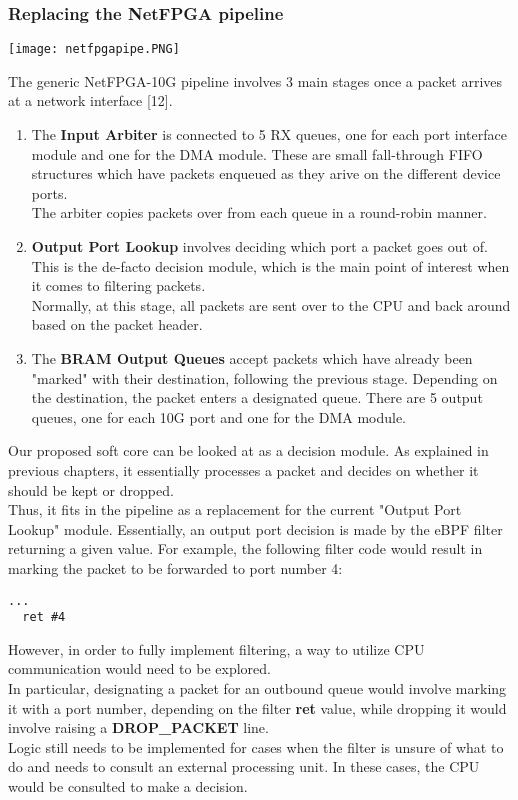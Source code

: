 \documentclass{l4proj}
\begin{document}
\subsubsection{Replacing the NetFPGA pipeline}
\begin{center}
\texttt{[image: netfpgapipe.PNG]}\\
\end{center}
The generic NetFPGA-10G pipeline involves 3 main stages once a packet arrives at a network interface [12].
\begin{enumerate}
    \item The \textbf{Input Arbiter} is connected to 5 RX queues, one for each port interface module and one for the DMA module. These are small fall-through FIFO structures which have packets enqueued as they arive on the different device ports.\\
    The arbiter copies packets over from each queue in a round-robin manner.
    \item \textbf{Output Port Lookup} involves deciding which port a packet goes out of. This is the de-facto decision module, which is the main point of interest when it comes to filtering packets.\\
    Normally, at this stage, all packets are sent over to the CPU and back around based on the packet header.
    \item The \textbf{BRAM Output Queues} accept packets which have already been "marked" with their destination, following the previous stage. Depending on the destination, the packet enters a designated queue. There are 5 output queues, one for each 10G port and one for the DMA module.
\end{enumerate}
Our proposed soft core can be looked at as a decision module. As explained in previous chapters, it essentially processes a packet and decides on whether it should be kept or dropped.\\
Thus, it fits in the pipeline as a replacement for the current "Output Port Lookup" module. Essentially, an output port decision is made by the eBPF filter returning a given value. For example, the following filter code would result in marking the packet to be forwarded to port number 4:
\begin{lstlisting}[language=ebpfAsm]
  ...
  ret #4
\end{lstlisting}
However, in order to fully implement filtering, a way to utilize CPU communication would need to be explored.\\
In particular, designating a packet for an outbound queue would involve marking it with a port number, depending on the filter \textbf{ret} value, while dropping it would involve raising a \textbf{DROP\_PACKET} line.\\
Logic still needs to be implemented for cases when the filter is unsure of what to do and needs to consult an external processing unit. In these cases, the CPU would be consulted to make a decision.
\end{document}
